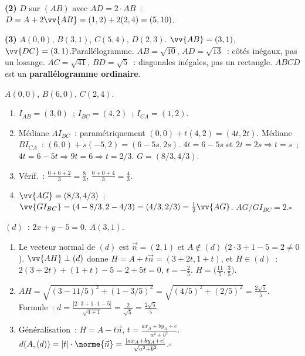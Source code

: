 \textbf{(2)} $D$ sur $(AB)$ avec $AD=2\cdot AB$~: $D=A+2\vv{AB}=(1,2)+2(2,4)=(5,10)$.

\textbf{(3)} $A(0,0)$, $B(3,1)$, $C(5,4)$, $D(2,3)$.
$\vv{AB}=(3,1)$, $\vv{DC}=(3,1)$.\checkmark\quad Parall\'elogramme.
$AB=\sqrt{10}$, $AD=\sqrt{13}$~: c\^ot\'es in\'egaux, pas un losange.
$AC=\sqrt{41}$, $BD=\sqrt{5}$~: diagonales in\'egales, pas un rectangle.
$ABCD$ est un \textbf{parall\'elogramme ordinaire}.


$A(0,0)$, $B(6,0)$, $C(2,4)$.
\begin{enumerate}
  \item $I_{AB}=(3,0)$~; $I_{BC}=(4,2)$~; $I_{CA}=(1,2)$.
  \item M\'ediane $AI_{BC}$~: param\'etriquement $(0,0)+t(4,2)=(4t,2t)$.
        M\'ediane $BI_{CA}$~: $(6,0)+s(-5,2)=(6-5s,2s)$.
        $4t=6-5s$ et $2t=2s\Rightarrow t=s$~; $4t=6-5t\Rightarrow9t=6\Rightarrow t=2/3$.
        $G=(8/3,4/3)$.
  \item V\'erif.~: $\tfrac{0+6+2}{3}=\tfrac{8}{3}$, $\tfrac{0+0+4}{3}=\tfrac{4}{3}$.\checkmark
  \item $\vv{AG}=(8/3,4/3)$~; $\vv{GI_{BC}}=(4-8/3,2-4/3)=(4/3,2/3)=\frac{1}{2}\vv{AG}$.
        $AG/GI_{BC}=2$.\hfill$\square$
\end{enumerate}


$(d)$~: $2x+y-5=0$, $A(3,1)$.
\begin{enumerate}
  \item Le vecteur normal de $(d)$ est $\vec{n}=(2,1)$ et $A\notin(d)$ ($2\cdot3+1-5=2\ne0$).
        $\vv{AH}\perp(d)$ donne $H=A+t\vec{n}=(3+2t,1+t)$, et $H\in(d)$~: $2(3+2t)+(1+t)-5=2+5t=0$, $t=-\tfrac25$.
        $H=\bigl(\tfrac{11}{5},\tfrac35\bigr)$.
  \item $AH=\sqrt{(3-11/5)^2+(1-3/5)^2}=\sqrt{(4/5)^2+(2/5)^2}=\frac{2\sqrt{5}}{5}$.
        Formule~: $d=\frac{|2\cdot3+1\cdot1-5|}{\sqrt{4+1}}=\frac{2}{\sqrt{5}}=\frac{2\sqrt{5}}{5}$.\checkmark
  \item G\'en\'eralisation~: $H=A-t\vec{n}$, $t=\frac{ax_A+by_A+c}{a^2+b^2}$.
        $d(A,(d))=|t|\cdot\norme{\vec{n}}=\frac{|ax_A+by_A+c|}{\sqrt{a^2+b^2}}$.\hfill$\square$
\end{enumerate}

